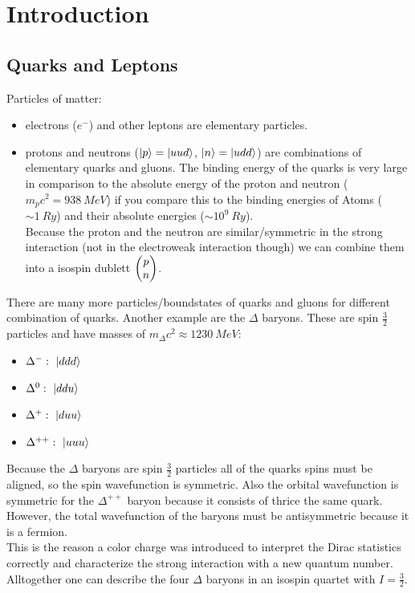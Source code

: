 \chapter{Introduction}
\section{Quarks and Leptons}
Particles of matter:
\begin{itemize}
	\item electrons ($e^-$) and other leptons are elementary particles. 
	\item protons and neutrons ($|p\rangle = |uud\rangle$, $|n\rangle = |udd\rangle$) are combinations of elementary quarks and gluons. The binding energy of the quarks is very large in comparison to the absolute energy of the proton and neutron ($m_pc^2 = 938~\si{MeV}$) if you compare this to the binding energies of Atoms ($\sim 1~\si{Ry}$) and their absolute energies ($\sim 10^9~\si{Ry}$).\\
		Because the proton and the neutron are similar/symmetric in the strong interaction (not in the electroweak interaction though) we can combine them into a isospin dublett $\begin{pmatrix} p \\ n \end{pmatrix}$.
\end{itemize}
There are many more particles/boundstates of quarks and gluons for different combination of quarks. Another example are the $\Delta$ baryons. These are spin $\frac{3}{2}$ particles and have masses of $m_\Delta c^2 \approx 1230 ~\si{MeV}$:
\begin{itemize}
	\item $\Delta^-:~|ddd\rangle$
	\item $\Delta^0:~|ddu\rangle$
	\item $\Delta^+:~|duu\rangle$
	\item $\Delta^{++}:~|uuu\rangle$
\end{itemize}
Because the $\Delta$ baryons are spin $\frac{3}{2}$ particles all of the quarks spins must be aligned, so the spin wavefunction is symmetric. Also the orbital wavefunction is symmetric for the $\Delta^{++}$ baryon because it consists of thrice the same quark. However, the total wavefunction of the baryons must be antisymmetric because it is a fermion.\\
This is the reason a color charge was introduced to interpret the Dirac statistics correctly and characterize the strong interaction with a new quantum number.\\
Alltogether one can describe the four $\Delta$ baryons in an isospin quartet with $I = \frac{3}{2}$.\\
